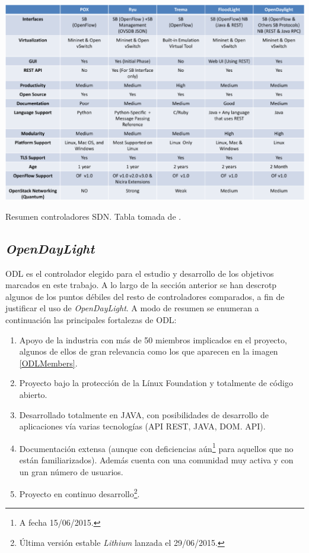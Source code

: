 \documentclass[a4paper,11pt]{book}
\begin{document}
\newpage

\begin{table}[tb]
\centering
\hspace*{-1.2cm}
\includegraphics[scale=0.55]{./figuras/comparativaController}
\caption[Resumen controladores SDN]{Resumen controladores SDN. Tabla tomada de \cite{comparativaSDN1}.}\label{resumen}
\end{table}

\subsection{\emph{OpenDayLight}}\label{opendaylight}
\ac{ODL} es el controlador elegido para el estudio y desarrollo de los objetivos marcados en este trabajo. A lo largo de la sección anterior se han descrotp algunos de los puntos débiles del resto de controladores comparados, a fin de justificar el uso de \emph{OpenDayLight}. A modo de resumen se enumeran a continuación las principales fortalezas de \ac{ODL}:

\begin{enumerate}
\item Apoyo de la industria con más de 50 miembros implicados en el proyecto, algunos de ellos de gran relevancia como los que aparecen en la imagen \ref{ODLMembers}.
\item Proyecto bajo la protección de la Línux Foundation y totalmente de código abierto.
\item Desarrollado totalmente en JAVA, con posibilidades de desarrollo de aplicaciones vía varias tecnologías ({API} \ac{REST}, JAVA, \ac{DOM}. \ac{API}).
\item Documentación extensa (aunque con deficiencias aún\footnote{A fecha 15/06/2015.} para aquellos que no están familiarizados). Además cuenta con una comunidad muy activa y con un gran número de usuarios.
\item Proyecto en continuo desarrollo\footnote{Última versión estable \textit{Lithium} lanzada el 29/06/2015.}.
\end{enumerate}
\end{document}
